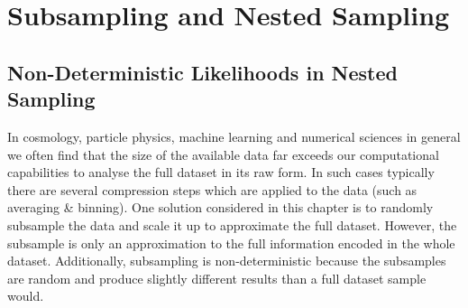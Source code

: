
\chapter{Subsampling and Nested Sampling}\label{ch:chapter3}

\ifpdf
    \graphicspath{{Chapter3/Figs/Raster/}{Chapter3/Figs/PDF/}{Chapter3/Figs/}}
\else
    \graphicspath{{Chapter3/Figs/Vector/}{Chapter3/Figs/}}
\fi

\section{Non-Deterministic Likelihoods in Nested Sampling}

In cosmology, particle physics, machine learning and numerical sciences in general we often find that the size of the available data far exceeds our computational capabilities to  analyse the full dataset in its raw form. In such cases typically there are several compression steps which are applied to the data (such as averaging \& binning). One solution considered in this chapter is to randomly subsample the data and scale it up to approximate the full dataset. However, the subsample is only an approximation to the full information encoded in the whole dataset. Additionally, subsampling is non-deterministic because the subsamples are random and produce slightly different results than a full dataset sample would. 

